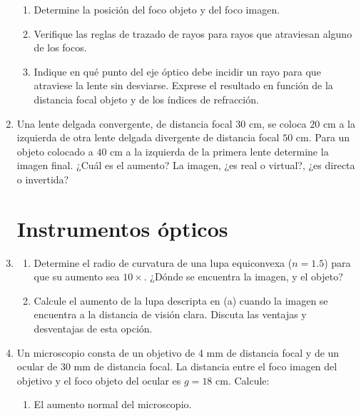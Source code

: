 \documentclass[11pt,spanish]{article}
\begin{document}
\begin{enumerate}
\begin{enumerate}
        \item Determine la posición del foco objeto y del foco imagen.
    
        \item Verifique las reglas de trazado de rayos para rayos que atraviesan
        alguno de los focos.
    
        \item Indique en qué punto del eje óptico debe incidir un rayo para que
        atraviese la lente sin desviarse. Exprese el resultado en función de la
        distancia focal objeto y de los índices de refracción.
    \end{enumerate}


    \item Una lente delgada convergente, de distancia focal 30 cm, se coloca
    $20$ cm a la izquierda de otra lente delgada divergente de distancia focal
    $50$ cm. Para un objeto colocado a $40$ cm a la izquierda de la
    primera lente determine la imagen final. ¿Cuál es el aumento? La imagen,
    ¿es real o virtual?, ¿es directa o invertida?

\section*{Instrumentos ópticos}

    
    \item 
    \begin{enumerate}
        \item Determine el radio de curvatura de una lupa equiconvexa ($n=1.5$)
        para que su aumento sea $10 \times$. ¿Dónde se encuentra la imagen, y
        el objeto?
        
        \item Calcule el aumento de la lupa descripta en (a) cuando la imagen se
        encuentra a la distancia de visión clara. Discuta las ventajas y
        desventajas de esta opción.
    \end{enumerate}

    
    \item Un microscopio consta de un objetivo de 4 mm de distancia focal y
    de un ocular de $30$ mm de distancia focal. La distancia entre el foco
    imagen del objetivo y el foco objeto del ocular es $g=18$ cm. Calcule:

    \begin{enumerate}
        \item El aumento normal del microscopio.
        

\end{enumerate}
\end{enumerate}
\end{document}
